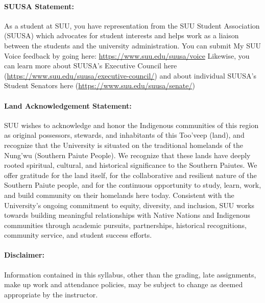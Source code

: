 \documentclass[12pt, letterpaper]{article}
\begin{document}
\paragraph{SUUSA Statement:}
As a student at SUU, you have representation from the SUU Student Association (SUUSA) which advocates for student interests and helps work as a liaison between the students and the university administration. You can submit My SUU Voice feedback by going here: \href{https://www.suu.edu/suusa/voice}{https://www.suu.edu/suusa/voice} Likewise, you can learn more about SUUSA's Executive Council here (\href{https://www.suu.edu/suusa/executive-council/}{https://www.suu.edu/suusa/executive-council/}) and about individual SUUSA's Student Senators here (\href{https://www.suu.edu/suusa/senate/}{https://www.suu.edu/suusa/senate/})

\paragraph{Land Acknowledgement Statement:}
SUU wishes to acknowledge and honor the Indigenous communities of this region as original possessors, stewards, and inhabitants of this Too’veep (land), and recognize that the University is situated on the traditional homelands of the Nung’wu (Southern Paiute People). We recognize that these lands have deeply rooted spiritual, cultural, and historical significance to the Southern Paiutes. We offer gratitude for the land itself, for the collaborative and resilient nature of the Southern Paiute people, and for the continuous opportunity to study, learn, work, and build community on their homelands here today. Consistent with the University's ongoing commitment to equity, diversity, and inclusion, SUU works towards building meaningful relationships with Native Nations and Indigenous communities through academic pursuits, partnerships, historical recognitions, community service, and student success efforts.

\paragraph{Disclaimer:}
Information contained in this syllabus, other than the grading, late assignments, make up work and attendance policies, may be subject to change as deemed appropriate by the instructor.
\end{document}
